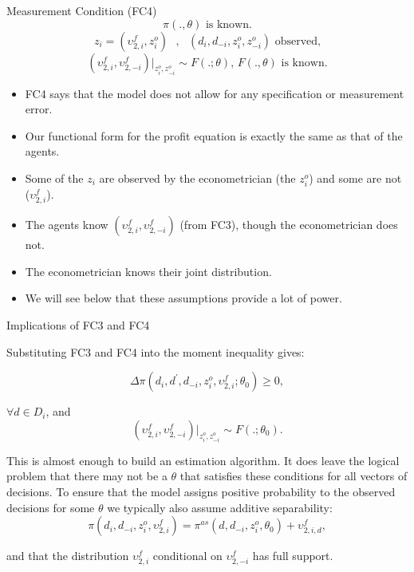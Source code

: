 \begin{frame}{Measurement Condition (FC4)}
\begin{equation*}
\pi (.,\theta )\text{ is known.}
\end{equation*}%
\begin{equation*}
z_{i}=(\upsilon _{2,i}^{f},z_{i}^{o})\text{ },\text{ }%
(d_{i},d_{-i},z_{i}^{o},z_{-i}^{o})\text{ observed,}
\end{equation*}%
\begin{equation*}
(\upsilon _{2,i}^{f},\upsilon _{2,-i}^{f})|_{z_{i}^{o},z_{-i}^{o}}\sim
F(.;\theta )\text{, }F(.,\theta )\text{ is known.}
\end{equation*}
\begin{itemize}
\item FC4 says that the model does not allow for any specification or measurement
error. 
\item Our functional form for the profit equation is exactly the
same as that of the agents.
\item Some of the $z_{i}$ are observed by the
econometrician (the $z_{i}^{o}$) and some are not ($\upsilon _{2,i}^{f}$).
\item The agents know $(\upsilon _{2,i}^{f},\upsilon _{2,-i}^{f})$ (from FC3), though the
econometrician does not.
\item The econometrician knows their joint distribution.
\item  We will see below that these assumptions provide a lot of power.
\end{itemize}
\end{frame}


\begin{frame}{Implications of FC3 and FC4}

Substituting FC3 and FC4 into the moment inequality gives:

\begin{equation*}
\Delta \pi (d_{i},d^{\prime },d_{-i},z_{i}^{o},\upsilon _{2,i}^{f};\theta
_{0})\geq 0,
\end{equation*}

$\forall d\in D_{i}$, and%
\begin{equation*}
(\upsilon _{2,i}^{f},\upsilon _{2,-i}^{f})|_{z_{i}^{o},z_{-i}^{o}}\sim
F(.;\theta _{0}).
\end{equation*}

This is almost enough to build an estimation algorithm. It does leave the
logical problem that there may not be a $\theta $ that satisfies these
conditions for all vectors of decisions. To ensure that the model assigns
positive probability to the observed decisions for some $\theta $ we
typically also assume additive separability:%
\begin{equation*}
\pi (d_{i},d_{-i},z_{i}^{o},\upsilon _{2,i}^{f})=\pi
^{as}(d,d_{-i},z_{i}^{o},\theta _{0})+\upsilon _{2,i,d}^{f},
\end{equation*}

and that the distribution $\upsilon _{2,i}^{f}$ conditional on $\upsilon
_{2,-i}^{f}$ has full support.
\end{frame}

